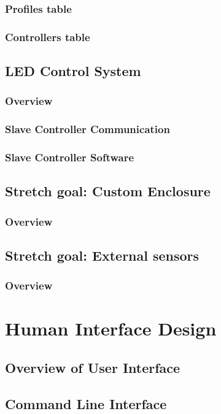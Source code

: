 \documentclass[onecolumn, draftclsnofoot,10pt, compsoc]{IEEEtran}
\begin{document}
			\subsubsection{Profiles table}
			\subsubsection{Controllers table}

		\subsection{LED Control System}
			\subsubsection{Overview}
			\subsubsection{Slave Controller Communication}
			\subsubsection{Slave Controller Software}

		\subsection{Stretch goal: Custom Enclosure}
			\subsubsection{Overview}
		\subsection{Stretch goal: External sensors}
			\subsubsection{Overview}

	\section{Human Interface Design}
		\subsection{Overview of User Interface}
		\subsection{Command Line Interface}
\end{document}
